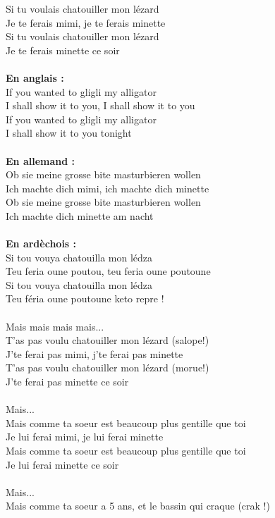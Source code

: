 \breakpage
Si tu voulais chatouiller mon lézard
\\Je te ferais mimi, je te ferais minette
\\Si tu voulais chatouiller mon lézard
\\Je te ferais minette ce soir
\\\\\textbf{En anglais :}
\\If you wanted to gligli my alligator
\\I shall show it to you, I shall show it to you
\\If you wanted to gligli my alligator
\\I shall show it to you tonight
\\\\\textbf{En allemand :}
\\Ob sie meine grosse bite masturbieren wollen
\\Ich machte dich mimi, ich machte dich minette
\\Ob sie meine grosse bite masturbieren wollen
\\Ich machte dich minette am nacht
\\\\\textbf{En ardèchois :}
\\Si tou vouya chatouilla mon lédza
\\Teu feria oune poutou, teu feria oune poutoune
\\Si tou vouya chatouilla mon lédza
\\Teu féria oune poutoune keto repre !
\\\\Mais mais mais mais...
\\T'as pas voulu chatouiller mon lézard (salope!)
\\J'te ferai pas mimi, j'te ferai pas minette
\\T'as pas voulu chatouiller mon lézard (morue!)
\\J'te ferai pas minette ce soir
\\\\Mais...
\\Mais comme ta soeur est beaucoup plus gentille que toi
\\Je lui ferai mimi, je lui ferai minette
\\Mais comme ta soeur est beaucoup plus gentille que toi
\\Je lui ferai minette ce soir
\\\\Mais...
\\Mais comme ta soeur a 5 ans, et le bassin qui craque (crak !)
